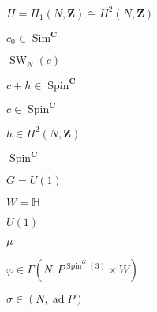\begin{preview}
\setcounter{equation}{0}%
\( H = H_1( N, \mathbf{Z} ) \cong H^2(N , \mathbf{Z}) \)
\end{preview}

\begin{preview}
\setcounter{equation}{0}%
\( c_0 \in \operatorname{Sim}^{ \mathbf{C}} \)
\end{preview}

\begin{preview}
\setcounter{equation}{0}%
\( \operatorname{SW}_N(c) \)
\end{preview}

\begin{preview}
\setcounter{equation}{0}%
\( c + h\in \operatorname{Spin}^{ \mathbf{C}} \)
\end{preview}

\begin{preview}
\setcounter{equation}{0}%
\( c\in \operatorname{Spin}^{ \mathbf{C}} \)
\end{preview}

\begin{preview}
\setcounter{equation}{0}%
\( h\in H^2(N , \mathbf{Z}) \)
\end{preview}

\begin{preview}
\setcounter{equation}{0}%
\( \operatorname{Spin} ^{ \mathbf{C}} \)
\end{preview}

\begin{preview}
\setcounter{equation}{0}%
\( G = U(1) \)
\end{preview}

\begin{preview}
\setcounter{equation}{0}%
\( W = \mathbb{H} \)
\end{preview}

\begin{preview}
\setcounter{equation}{0}%
\( U(1) \)
\end{preview}

\begin{preview}
\setcounter{equation}{0}%
\( \mu \)
\end{preview}

\begin{preview}
\setcounter{equation}{0}%
\( \varphi\in \Gamma(N, P^{\operatorname{Spin}^G(3)} \times W) \)
\end{preview}

\begin{preview}
\setcounter{equation}{0}%
\( \sigma \in (N , \operatorname{ad} P) \)
\end{preview}

